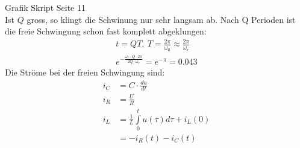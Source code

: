 Grafik Skript Seite 11\\
Ist $Q$ gross, so klingt die Schwinung nur sehr langsam ab. Nach Q Perioden ist
die freie Schwingung schon fast komplett abgeklungen: 
\begin{align}
t=QT,\ T=\frac{2\pi}{\omega_0}\approx\frac{2\pi}{\omega_r}\nonumber\\
e^{-\frac{\omega_r\cdot Q \cdot 2\pi}{2Q\cdot \omega_r}}=e^{-\pi} = 0.043
\nonumber
\end{align}
Die Ströme bei der freien Schwingung sind:\\
\begin{align}
	i_C&=C\cdot\frac{du}{dt}\\
	i_R&=\frac{U}{R}\\
	i_L&=\frac{1}{L}\int\limits_0^t{u(\tau)d\tau+i_L(0)}\\
	&=-i_R(t)-i_C(t)
\end{align}